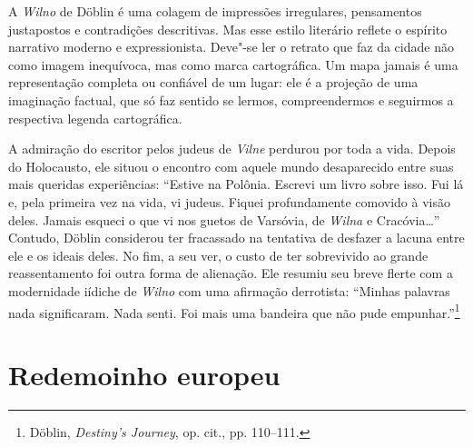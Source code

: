 A \textit{Wilno} de Döblin é uma colagem de impressões irregulares, pensamentos
justapostos e contradições descritivas. Mas esse estilo literário
reflete o espírito narrativo moderno e expressionista. Deve"-se ler o
retrato que faz da cidade não como imagem inequívoca, mas como marca
cartográfica. Um mapa jamais é uma representação completa ou confiável
de um lugar: ele é a projeção de uma imaginação factual, que só faz
sentido se lermos, compreendermos e seguirmos a respectiva legenda
cartográfica.

A admiração do escritor pelos judeus de \textit{Vilne} perdurou por toda a vida.
Depois do Holocausto, ele situou o encontro com aquele mundo
desaparecido entre suas mais queridas experiências: ``Estive na Polônia.
Escrevi um livro sobre isso. Fui lá e, pela primeira vez na vida, vi
judeus. Fiquei profundamente comovido à visão deles. Jamais esqueci o
que vi nos guetos de Varsóvia, de \textit{Wilna} e Cracóvia\ldots{}'' Contudo,
Döblin considerou ter fracassado na tentativa de desfazer a lacuna entre
ele e os ideais deles. No fim, a seu ver, o custo de ter sobrevivido ao
grande reassentamento foi outra forma de alienação. Ele resumiu seu
breve flerte com a modernidade iídiche de \textit{Wilno} com uma afirmação
derrotista: ``Minhas palavras nada significaram. Nada senti. Foi mais
uma bandeira que não pude empunhar.''\footnote{Döblin, \textit{Destiny's Journey}, op. cit., pp. 110--111.}


\chapter[Redemoinho europeu \medskip]{Redemoinho europeu}

\begin{epigraphs} 
\end{epigraphs}

